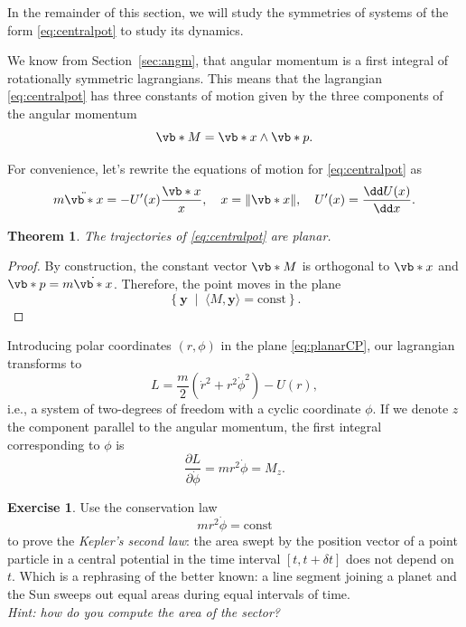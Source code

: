 \documentclass[english,fontsize=11pt,paper=b5]{scrbook}
\newtheorem{theorem}{Theorem}[chapter]
\theoremstyle{definition}
\newtheorem{exercise}{Exercise}[chapter]
\begin{document}
    In the remainder of this section, we will study the symmetries of systems of the form \eqref{eq:centralpot} to study its dynamics.

    We know from Section~\ref{sec:angm}, that angular momentum is a first integral of rotationally symmetric lagrangians.
    This means that the lagrangian \eqref{eq:centralpot} has three constants of motion given by the three components of the angular momentum
    \begin{equation}
      \vb*{M} = \vb*{x}\wedge \vb*{p}.
    \end{equation}

    For convenience, let's rewrite the equations of motion for \eqref{eq:centralpot} as
    \begin{equation}
      m\ddot{\vb*{x}} = - U'(x)\frac{\vb*{x}}{x}, \quad x = \|\vb*{x}\|, \quad U'(x)=\frac{\dd U(x)}{\dd x}.
    \end{equation}

    \begin{theorem}
      The trajectories of \eqref{eq:centralpot} are planar.
    \end{theorem}
    \begin{proof}
      By construction, the constant vector $\vb*{M}$ is orthogonal to $\vb*{x}$ and $\vb*{p} = m \dot{\vb*{x}}$.
      Therefore, the point moves in the plane
      \begin{equation}\label{eq:planarCP}
        \left\{\mathbf{y} \;\mid\; \langle M, \mathbf{y}\rangle = \mathrm{const} \right\}.
      \end{equation}
    \end{proof}

    Introducing polar coordinates $(r,\phi)$ in the plane \eqref{eq:planarCP}, our lagrangian transforms to
    \begin{equation}
      L = \frac{m}{2} \left(\dot r^2 + r^2 \dot \phi^2\right) - U(r),
    \end{equation}
    i.e., a system of two-degrees of freedom with a cyclic coordinate $\phi$.
    If we denote $z$ the component parallel to the angular momentum, the first integral corresponding to $\phi$ is
    \begin{equation}\label{eq:cyclicphi}
      \frac{\partial L}{\partial \dot \phi} = m r^2 \dot \phi = M_z.
    \end{equation}

    \begin{exercise}
      Use the conservation law
      \begin{equation}
        m r^2 \dot \phi = \mathrm{const}
      \end{equation}
      to prove the \emph{Kepler's second law}: the area swept by the position vector of a point particle in a central potential in the time interval $[t, t+\delta t]$ does not depend on $t$. Which is a rephrasing of the better known: a line segment joining a planet and the Sun sweeps out equal areas during equal intervals of time.\\
      \textit{Hint: how do you compute the area of the sector?}
    \end{exercise}
\end{document}
